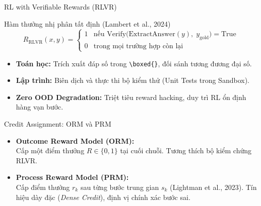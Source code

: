 \begin{frame}{RL with Verifiable Rewards (RLVR)}
  \begin{block}{Hàm thưởng nhị phân tất định (Lambert et al., 2024)}
    \[
      R_{\text{RLVR}}(x, y) = \begin{cases}
        1 & \text{nếu } \mathrm{Verify}\big(\mathrm{ExtractAnswer}(y),\; y_{\text{gold}}\big) = \mathrm{True} \\
        0 & \text{trong mọi trường hợp còn lại}
      \end{cases}
    \]
  \end{block}

  \small
  \begin{itemize}\setlength{\itemsep}{5pt}
    \item \textbf{Toán học:} Trích xuất đáp số trong \texttt{\textbackslash boxed\{\}}, đối sánh tương đương đại số.
    \item \textbf{Lập trình:} Biên dịch và thực thi bộ kiểm thử (Unit Tests trong Sandbox).
    \item \textbf{Zero OOD Degradation:} Triệt tiêu reward hacking, duy trì RL ổn định hàng vạn bước.
  \end{itemize}
  \par\vspace{0pt}
\end{frame}

\begin{frame}{Credit Assignment: ORM và PRM}
  \small
  \begin{itemize}\setlength{\itemsep}{6pt}
    \item \textbf{Outcome Reward Model (ORM):}\\
      Cấp một điểm thưởng $R \in \{0, 1\}$ tại cuối chuỗi. Tương thích bộ kiểm chứng RLVR.
    \item \textbf{Process Reward Model (PRM):}\\
      Cấp điểm thưởng $r_k$ sau từng bước trung gian $s_k$ (Lightman et al., 2023). Tín hiệu dày đặc (\textit{Dense Credit}), định vị chính xác bước sai.
  \end{itemize}
  \par\vspace{0pt}
\end{frame}

